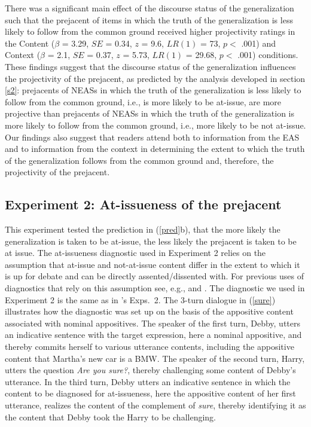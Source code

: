 \documentclass[11pt,fleqn]{article}
\newcommand{\6}{\mbox{$[\hspace*{-.6mm}[$}}
\newcommand{\9}{\mbox{$]\hspace*{-.6mm}]$}}
\newcommand{\citepos}[1]{\citeauthor{#1}'s \citeyear{#1}}
\begin{document}
There was a significant main effect of the discourse status of the generalization such that the prejacent of items in which the truth of the generalization is less likely to follow from the common ground received higher projectivity ratings in the Content ($\beta$ = 3.29, $SE$ = 0.34, $z$ = 9.6, $LR(1)$ = 73, $p <$ .001) and Context ($\beta$ = 2.1, $SE$ = 0.37, $z$ = 5.73, $LR(1)$ = 29.68, $p <$ .001) conditions. These findings suggest that the discourse status of the generalization influences the projectivity of the prejacent, as predicted by the analysis developed in section \ref{s2}: prejacents of NEASs in which the truth of the generalization is less likely to follow from the common ground, i.e., is more likely to be at-issue, are more projective than prejacents of NEASs in which the truth of the generalization is more likely to follow from the common ground, i.e., more likely to be not at-issue. Our findings also suggest that readers attend both to information from the EAS and to information from the context in determining the extent to which the truth of the generalization follows from the common ground and, therefore, the projectivity of the prejacent.

\subsection{Experiment 2: At-issueness of the prejacent}\label{s32}

This experiment tested the prediction in (\ref{pred}b), that the more likely the generalization is taken to be at-issue, the less likely the prejacent is taken to be at issue. The at-issueness diagnostic used in Experiment 2 relies on the assumption that at-issue and not-at-issue content differ in the extent to which it is up for debate and can be directly assented/dissented with. For previous uses of diagnostics that rely on this assumption see, e.g., \citealt{amaral-etal07,xue-onea11,murray2014,anderbois-etal2015,destruel-etal2015,tonhauser-sula6,syrett-koev2015} and \citealt{tbd-variability}. The diagnostic we used in Experiment 2 is the same as in  \citepos{tbd-variability} Exps.~2. The 3-turn dialogue in (\ref{sure}) illustrates how the diagnostic was set up on the basis of the appositive content associated with nominal appositives. The speaker of the first turn, Debby, utters an indicative sentence with the target expression, here a nominal appositive, and thereby commits herself to various utterance contents, including the appositive content that Martha's new car is a BMW. The speaker of the second turn, Harry, utters the question {\em Are you sure?}, thereby challenging some content of Debby's utterance. In the third turn, Debby utters an indicative sentence in which the content to be diagnosed for at-issueness, here the appositive content of her first utterance, realizes the content of the  complement of {\em sure}, thereby identifying it as the content that Debby took the Harry to be challenging. 
\end{document}
